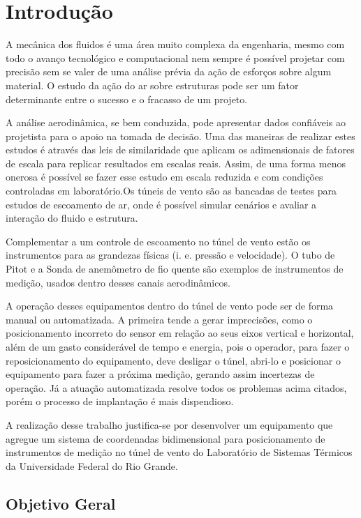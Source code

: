 \chapter{Introdução}\label{ch:introducao}

A mecânica dos fluidos é uma área muito complexa da engenharia, mesmo com todo o avanço tecnológico e computacional 
nem sempre é possível  projetar com precisão sem se valer de uma análise prévia da ação de esforços sobre algum material. 
O estudo da ação do ar sobre estruturas pode ser um fator determinante entre o sucesso e o fracasso de um projeto. 

A análise aerodinâmica, se bem conduzida, pode apresentar dados confiáveis ao projetista para o apoio na tomada 
de decisão. Uma das maneiras de realizar estes estudos é através das leis de similaridade que aplicam os adimensionais 
de fatores de escala para replicar resultados em escalas reais. Assim, de uma forma menos onerosa é possível se fazer 
esse estudo em  escala reduzida e com condições controladas em laboratório.Os túneis de vento são as bancadas de testes 
para estudos de escoamento de ar, onde é possível simular cenários e avaliar a interação do fluido e estrutura.

Complementar a um controle de escoamento no túnel de vento estão os instrumentos para as grandezas físicas 
(i. e. pressão e velocidade). O tubo de Pitot e a  Sonda de anemômetro de fio quente são exemplos de instrumentos 
de medição, usados  dentro desses canais aerodinâmicos.

A operação desses equipamentos dentro do túnel de vento pode ser de forma manual ou automatizada. A primeira tende a 
gerar imprecisões, como o  posicionamento incorreto do sensor em relação ao seus eixos vertical e horizontal, além de 
um gasto considerável de tempo e energia, pois o operador,  para fazer o reposicionamento do equipamento, deve desligar 
o túnel, abri-lo e posicionar o equipamento para fazer a próxima medição, gerando assim incertezas de operação. Já a 
atuação automatizada resolve todos os problemas acima citados, porém o processo de implantação é mais  dispendioso. 

A realização desse trabalho justifica-se por desenvolver um equipamento que agregue um sistema de coordenadas 
bidimensional para posicionamento de instrumentos de medição no túnel de vento do Laboratório de Sistemas Térmicos  
da Universidade Federal do Rio Grande.

\section{Objetivo Geral}\label{sec:objetivogeral}

